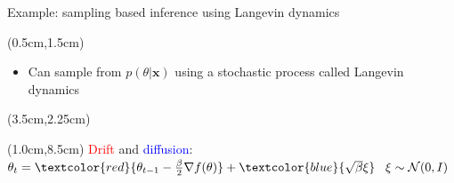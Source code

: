 \documentclass{beamer}					%
\begin{document}
\begin{frame}{Example: sampling based inference using Langevin dynamics}
\begin{textblock*}{13cm}(0.5cm,1.5cm)
\begin{itemize}
\item Can sample from $p(\theta\lvert \boldsymbol{x})$ using a stochastic process called Langevin dynamics
\end{itemize}
\end{textblock*}
\begin{textblock*}{8cm}(3.5cm,2.25cm)
\end{textblock*}
\begin{textblock*}{14cm}(1.0cm,8.5cm)
\textcolor{red}{Drift} and \textcolor{blue}{diffusion}: $\theta_{t} = \textcolor{red}{\theta_{t-1} - \frac{\beta}{2}\nabla f(\theta)} + \textcolor{blue}{\sqrt{\beta}\xi} \;\;\; \xi\sim \mathcal{N}(0,I)$
\end{textblock*}
\end{frame}

\end{document}

